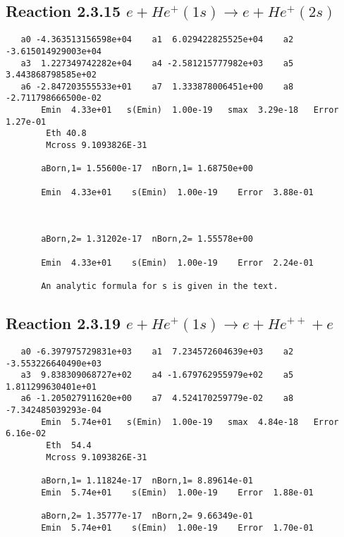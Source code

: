 \documentclass[12pt,dvipdfm]{article}
\begin{document}
\newpage
\subsection{
Reaction 2.3.15 $   e + He^+(1s) \rightarrow e + He^+(2s)$}





\begin{small}\begin{verbatim}
   a0 -4.363513156598e+04    a1  6.029422825525e+04    a2 -3.615014929003e+04
   a3  1.227349742282e+04    a4 -2.581215777982e+03    a5  3.443868798585e+02
   a6 -2.847203555533e+01    a7  1.333878006451e+00    a8 -2.711798666500e-02
       Emin  4.33e+01   s(Emin)  1.00e-19   smax  3.29e-18   Error  1.27e-01
        Eth 40.8
        Mcross 9.1093826E-31

       aBorn,1= 1.55600e-17  nBorn,1= 1.68750e+00

       Emin  4.33e+01    s(Emin)  1.00e-19    Error  3.88e-01



       aBorn,2= 1.31202e-17  nBorn,2= 1.55578e+00

       Emin  4.33e+01    s(Emin)  1.00e-19    Error  2.24e-01

       An analytic formula for s is given in the text.
\end{verbatim}\end{small}









\newpage
\subsection{
Reaction 2.3.19 $   e + He^+(1s) \rightarrow e + He^{++} + e$}


\begin{small}\begin{verbatim}
   a0 -6.397975729831e+03    a1  7.234572604639e+03    a2 -3.553226640490e+03
   a3  9.838309068727e+02    a4 -1.679762955979e+02    a5  1.811299630401e+01
   a6 -1.205027911620e+00    a7  4.524170259779e-02    a8 -7.342485039293e-04
       Emin  5.74e+01   s(Emin)  1.00e-19   smax  4.84e-18   Error  6.16e-02
        Eth  54.4
        Mcross 9.1093826E-31

       aBorn,1= 1.11824e-17  nBorn,1= 8.89614e-01
       Emin  5.74e+01    s(Emin)  1.00e-19    Error  1.88e-01

       aBorn,2= 1.35777e-17  nBorn,2= 9.66349e-01
       Emin  5.74e+01    s(Emin)  1.00e-19    Error  1.70e-01
\end{verbatim}\end{small}
\end{document}
